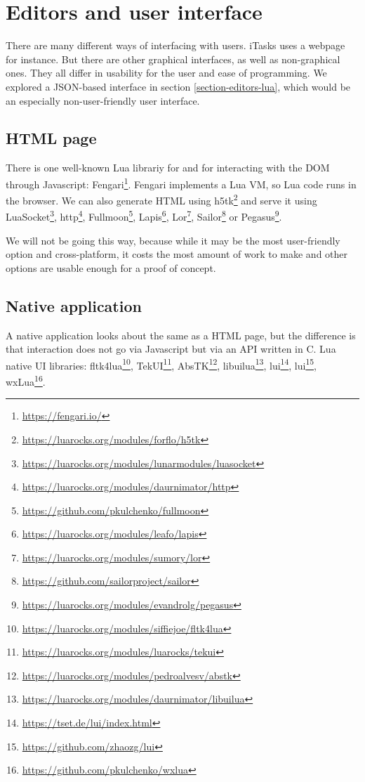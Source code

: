 \section{Editors and user interface}\label{section-editors-ui}
There are many different ways of interfacing with users. iTasks uses a webpage for instance. But there are other graphical interfaces, as well as non-graphical ones. They all differ in usability for the user and ease of programming. We explored a JSON-based interface in section \ref{section-editors-lua}, which would be an especially non-user-friendly user interface.

\subsection{HTML page}
There is one well-known Lua librariy for and for interacting with the DOM through Javascript: Fengari\footnote{\url{https://fengari.io/}}. Fengari implements a Lua VM, so Lua code runs in the browser. We can also generate HTML using h5tk\footnote{\url{https://luarocks.org/modules/forflo/h5tk}} and serve it using
LuaSocket\footnote{\url{https://luarocks.org/modules/lunarmodules/luasocket}},
http\footnote{\url{https://luarocks.org/modules/daurnimator/http}},
Fullmoon\footnote{\url{https://github.com/pkulchenko/fullmoon}},
Lapis\footnote{\url{https://luarocks.org/modules/leafo/lapis}},
Lor\footnote{\url{https://luarocks.org/modules/sumory/lor}},
Sailor\footnote{\url{https://github.com/sailorproject/sailor}} or
Pegasus\footnote{\url{https://luarocks.org/modules/evandrolg/pegasus}}.

We will not be going this way, because while it may be the most user-friendly option and cross-platform, it costs the most amount of work to make and other options are usable enough for a proof of concept.

\subsection{Native application}
A native application looks about the same as a HTML page, but the difference is that interaction does not go via Javascript but via an API written in C. Lua native UI libraries:
fltk4lua\footnote{\url{https://luarocks.org/modules/siffiejoe/fltk4lua}},
TekUI\footnote{\url{https://luarocks.org/modules/luarocks/tekui}},
AbsTK\footnote{\url{https://luarocks.org/modules/pedroalvesv/abstk}\label{footnote-abstk}},
libuilua\footnote{\url{https://luarocks.org/modules/daurnimator/libuilua}},
lui\footnote{\url{https://tset.de/lui/index.html}},
lui\footnote{\url{https://github.com/zhaozg/lui}},
wxLua\footnote{\url{https://github.com/pkulchenko/wxlua}}.

